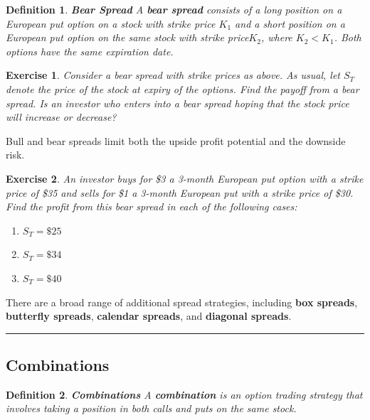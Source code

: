 \documentclass[letterpaper,10pt]{article}
\newtheorem{df}{Definition}[section]
\newtheorem{ex}{Exercise}
\begin{document}
\begin{df}{\bf Bear Spread}
A {\bf bear spread} consists of a long position on a European put option on a stock with strike price $K_1$ and a short position on a European put option on the same stock with strike price$K_2$, where $K_2<K_1$. Both options have the same expiration date.
\end{df}



\begin{ex}
Consider a bear spread with strike prices as above.  As usual, let $S_T$ denote the price of the stock at expiry of the options.  Find the payoff from a bear spread. Is an investor who enters into a bear spread hoping that the stock price will increase or decrease?
\end{ex}


\noindent Bull and bear spreads limit both the upside profit potential and the downside risk. 



\begin{ex}
An investor buys for \$3 a 3-month European put option with a strike price of \$35 and sells for \$1 a 3-month European put with a strike price of \$30. Find the profit from this bear spread in each of the following cases:
\begin{enumerate}
\item[(a)] $S_T=\$25$
\item[(b)] $S_T=\$34$
\item[(c)] $S_T=\$40$
\end{enumerate}
\end{ex}

\noindent There are a broad range of additional spread strategies, including {\bf box spreads}, {\bf butterfly spreads}, {\bf calendar spreads}, and {\bf diagonal spreads}.


\bigskip

\hrule

\bigskip



\subsection{Combinations}

\begin{df}{\bf Combinations}
A {\bf combination} is an option trading strategy that involves taking a position in both calls and puts on the same stock. 
\end{df}
\end{document}
